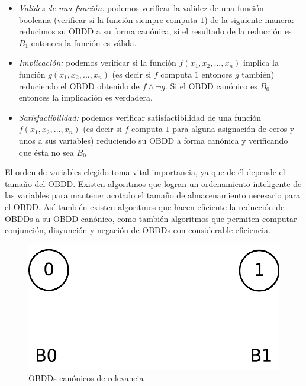 \documentclass[pdftex,a4paper,12pt]{book}
\begin{document}
\begin{itemize}
\item \textit{Validez de una funci\'on:} podemos verificar la validez de una funci\'on\\ booleana (verificar si la funci\'on siempre computa $1$) de la siguiente manera: reducimos su OBDD a su forma can\'onica, si el resultado de la reducci\'on es $B_1$ entonces la funci\'on es v\'alida.
\item \textit{Implicaci\'on:} podemos verificar si la funci\'on $f(x_1,x_2,...,x_n)$ implica la funci\'on $g(x_1,x_2,...,x_n)$ (es decir si $f$ computa $1$ entonces $g$ tambi\'en) reduciendo el OBDD obtenido de $f \wedge \neg g$. Si el OBDD can\'onico es $B_0$ entonces la implicaci\'on es verdadera.
\item \textit{Satisfactibilidad:} podemos verificar satisfactibilidad de una funci\'on\\ $f(x_1,x_2,...,x_n)$ (es decir si $f$ computa $1$ para alguna asignaci\'on de ceros y unos a sus variables) reduciendo su OBDD a forma can\'onica y verificando que \'esta no sea $B_0$
\end{itemize}

El orden de variables elegido toma vital importancia, ya que de \'el depende el tama\~no del OBDD. Existen algoritmos que logran un ordenamiento inteligente de las variables para mantener acotado el tama\~no de almacenamiento necesario para el OBDD. As\'i tambi\'en existen algoritmos que hacen eficiente la reducci\'on de OBDDs a su OBDD can\'onico, como tambi\'en algoritmos que permiten computar conjunci\'on, disyunci\'on y negaci\'on de OBDDs con considerable eficiencia.


\begin{figure}[htp]
  \centering
    \includegraphics[scale=0.5]{Imagenes/canonicos.pdf}
  \caption{OBDDs can\'onicos de relevancia}
  \label{canonicos}
\end{figure}
\end{document}
